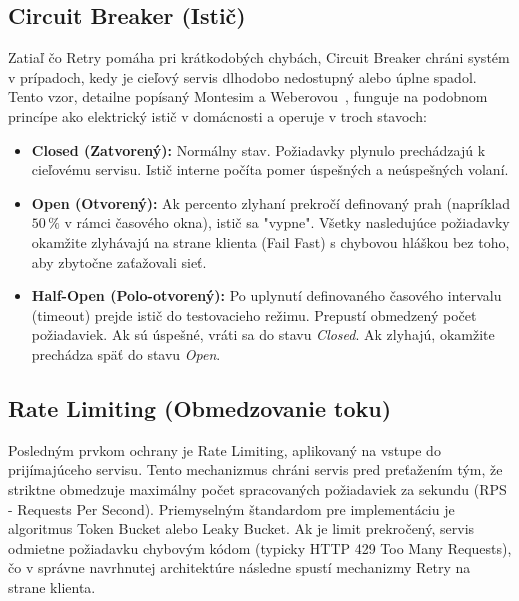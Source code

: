 \subsection{Circuit Breaker (Istič)}
Zatiaľ čo Retry pomáha pri krátkodobých chybách, Circuit Breaker chráni systém v prípadoch, kedy je cieľový servis dlhodobo nedostupný alebo úplne spadol. Tento vzor, detailne popísaný Montesim a Weberovou~\cite{Montesi2016}, funguje na podobnom princípe ako elektrický istič v domácnosti a operuje v troch stavoch:
\begin{itemize}
    \item \textbf{Closed (Zatvorený):} Normálny stav. Požiadavky plynulo prechádzajú k cieľovému servisu. Istič interne počíta pomer úspešných a neúspešných volaní.
    \item \textbf{Open (Otvorený):} Ak percento zlyhaní prekročí definovaný prah (napríklad $50\,\%$ v rámci časového okna), istič sa "vypne". Všetky nasledujúce požiadavky okamžite zlyhávajú na strane klienta (Fail Fast) s chybovou hláškou bez toho, aby zbytočne zaťažovali sieť.
    \item \textbf{Half-Open (Polo-otvorený):} Po uplynutí definovaného časového intervalu (timeout) prejde istič do testovacieho režimu. Prepustí obmedzený počet požiadaviek. Ak sú úspešné, vráti sa do stavu \textit{Closed}. Ak zlyhajú, okamžite prechádza späť do stavu \textit{Open}.
\end{itemize}

\subsection{Rate Limiting (Obmedzovanie toku)}
Posledným prvkom ochrany je Rate Limiting, aplikovaný na vstupe do prijímajúceho servisu. Tento mechanizmus chráni servis pred preťažením tým, že striktne obmedzuje maximálny počet spracovaných požiadaviek za sekundu (RPS - Requests Per Second). Priemyselným štandardom pre implementáciu je algoritmus Token Bucket alebo Leaky Bucket. Ak je limit prekročený, servis odmietne požiadavku chybovým kódom (typicky HTTP 429 Too Many Requests), čo v správne navrhnutej architektúre následne spustí mechanizmy Retry na strane klienta.

